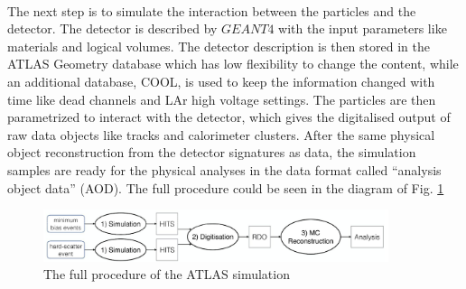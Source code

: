 \\The next step is to simulate the interaction between the particles and the detector. The detector is described by $GEANT4$ with the input parameters like materials and logical volumes. The detector description is then stored in the ATLAS Geometry database which has low flexibility to change the content, while an additional database, COOL, is used to keep the information changed with time like dead channels and LAr high voltage settings. The particles are then parametrized to interact with the detector, which gives the digitalised output of raw data objects like tracks and calorimeter clusters. After the same physical object reconstruction from the detector signatures as data, the simulation samples are ready for the physical analyses in the data format called ``analysis object data'' (AOD). The full procedure could be seen in the diagram of Fig. \ref{Fig:simulation}
\begin{figure}[!h]                
	\includegraphics[width=0.9\textwidth]{Chapter2/simulation.png}
	\centering
	\begin{center}
		\caption{The full procedure of the ATLAS simulation}
		\label{Fig:simulation}            
	\end{center}
\end{figure}
